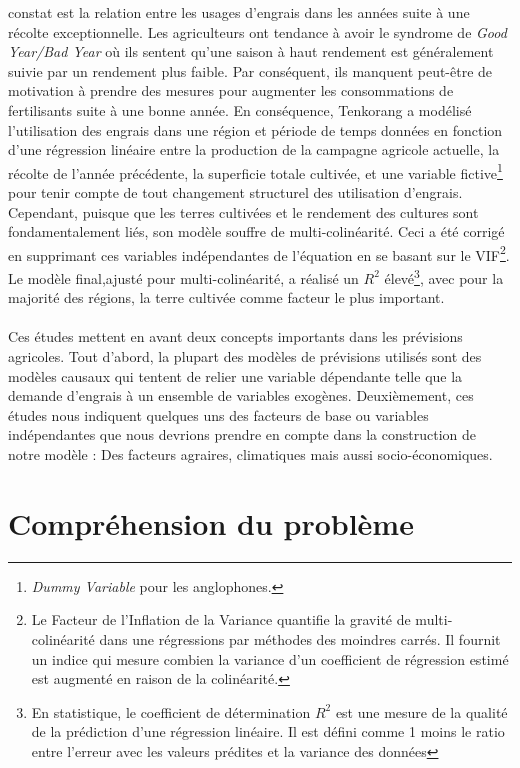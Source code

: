 constat est la relation entre les usages d'engrais dans les années suite à une récolte exceptionnelle.
Les agriculteurs ont tendance à avoir le syndrome de \textit{Good Year/Bad Year} où ils sentent qu'une saison à haut rendement est
généralement suivie par un rendement plus faible. Par conséquent, ils manquent peut-être de motivation à prendre des mesures pour augmenter les consommations de fertilisants suite à une bonne année. En conséquence, Tenkorang a modélisé l'utilisation des engrais dans une région et période de temps données en fonction d'une régression linéaire entre la production de la campagne agricole actuelle, la récolte de l'année précédente, la superficie totale cultivée, et une variable fictive\footnote{\textit{Dummy Variable} pour les anglophones.} pour tenir compte de tout changement structurel des utilisation d'engrais. Cependant, puisque que les terres cultivées et le rendement des cultures sont fondamentalement liés, son
modèle souffre de multi-colinéarité. Ceci a été corrigé en supprimant ces variables indépendantes de l'équation en se basant sur le VIF\footnote{Le Facteur de l'Inflation de la Variance quantifie la gravité de multi-colinéarité dans une régressions par méthodes des moindres carrés. Il fournit un indice qui mesure combien la variance d'un coefficient de régression estimé est augmenté en raison de la colinéarité.}. Le modèle final,ajusté pour multi-colinéarité, a réalisé un $R^2$ élevé\footnote{En statistique, le coefficient de détermination $R^2$ est une mesure de la qualité de la prédiction d'une régression linéaire. Il est défini comme 1 moins le ratio entre l'erreur avec les valeurs prédites et la variance des données}, avec pour la majorité des régions, la terre cultivée comme facteur le plus important.\paragraph{}
Ces études mettent en avant deux concepts importants dans les prévisions agricoles. Tout d'abord, la plupart des modèles de prévisions utilisés sont des modèles causaux qui tentent de relier une variable dépendante telle que la demande d'engrais à un ensemble de variables exogènes. Deuxièmement, ces études nous indiquent quelques uns des facteurs de base ou variables indépendantes que nous devrions prendre en compte dans la construction de notre modèle : Des facteurs agraires, climatiques mais aussi socio-économiques.
\section{Compréhension du problème}
